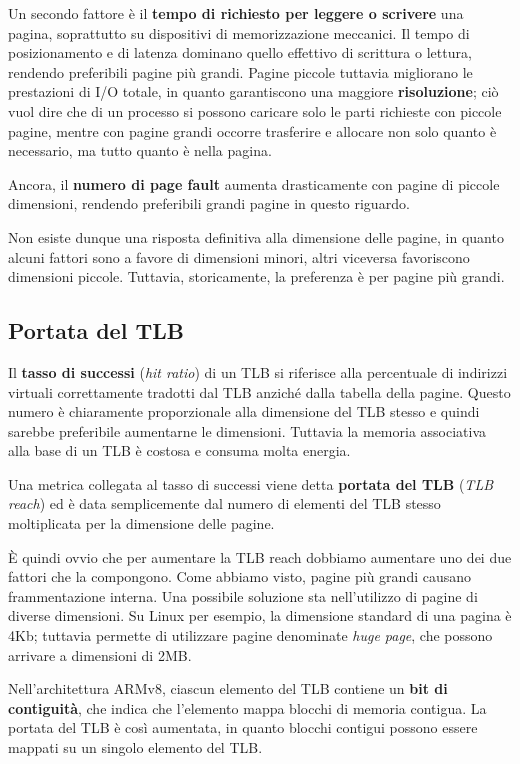         Un secondo fattore è il \textbf{tempo di richiesto per leggere o scrivere} una pagina, soprattutto su dispositivi di memorizzazione meccanici. Il tempo di posizionamento e di latenza dominano quello effettivo di scrittura o lettura, rendendo preferibili pagine più grandi. Pagine piccole tuttavia migliorano le prestazioni di I/O totale, in quanto garantiscono una maggiore \textbf{risoluzione}; ciò vuol dire che di un processo si possono caricare solo le parti richieste con piccole pagine, mentre con pagine grandi occorre trasferire e allocare non solo quanto è necessario, ma tutto quanto è nella pagina.
        
        Ancora, il \textbf{numero di page fault} aumenta drasticamente con pagine di piccole dimensioni, rendendo preferibili grandi pagine in questo riguardo.
        
        Non esiste dunque una risposta definitiva alla dimensione delle pagine, in quanto alcuni fattori sono a favore di dimensioni minori, altri viceversa favoriscono dimensioni piccole. Tuttavia, storicamente, la preferenza è per pagine più grandi.
        
    \subsection{Portata del TLB}
        Il \textbf{tasso di successi} (\textit{hit ratio}) di un TLB si riferisce alla percentuale di indirizzi virtuali correttamente tradotti dal TLB anziché dalla tabella della pagine. Questo numero è chiaramente proporzionale alla dimensione del TLB stesso e quindi sarebbe preferibile aumentarne le dimensioni. Tuttavia la memoria associativa alla base di un TLB è costosa e consuma molta energia.
        
        Una metrica collegata al tasso di successi viene detta \textbf{portata del TLB} (\textit{TLB reach}) ed è data semplicemente dal numero di elementi del TLB stesso moltiplicata per la dimensione delle pagine.
        
        È quindi ovvio che per aumentare la TLB reach dobbiamo aumentare uno dei due fattori che la compongono. Come abbiamo visto, pagine più grandi causano frammentazione interna. Una possibile soluzione sta nell'utilizzo di pagine di diverse dimensioni. Su Linux per esempio, la dimensione standard di una pagina è 4Kb; tuttavia permette di utilizzare pagine denominate \textit{huge page}, che possono arrivare a dimensioni di 2MB.
        
        Nell'architettura ARMv8, ciascun elemento del TLB contiene un \textbf{bit di contiguità}, che indica che l'elemento mappa blocchi di memoria contigua. La portata del TLB è così aumentata, in quanto blocchi contigui possono essere mappati su un singolo elemento del TLB.
        
